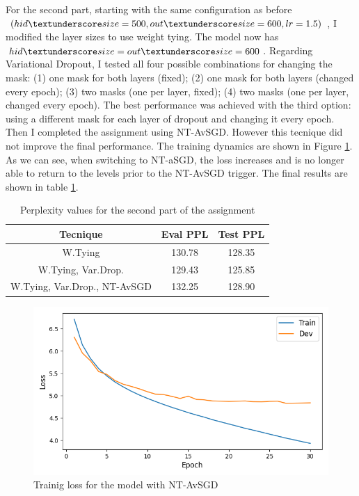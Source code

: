 \documentclass[a4paper]{article}
\begin{document}
For the second part, starting with the same configuration as before \((hid \textunderscore size=500, out \textunderscore size=600, lr=1.5)\), I modified the layer sizes to use weight tying.
The model now has \(hid \textunderscore size=out \textunderscore size=600\).
Regarding Variational Dropout, I tested all four possible combinations for changing the mask: (1) one mask for both layers (fixed); (2) one mask for both layers (changed every epoch); (3) two masks (one per layer, fixed); (4) two masks (one per layer, changed every epoch). The best performance was achieved with the third option: using a different mask for each layer of dropout and changing it every epoch.
Then I completed the assignment using NT-AvSGD. However this tecnique did not improve the final performance. The training dynamics are shown in Figure \ref{fig:fig2}. As we can see, when switching to NT-aSGD, the loss increases and is no longer able to return to the levels prior to the NT-AvSGD trigger.
The final results are shown in table \ref{tab:results2}.


\begin{table}[h]
  \centering
  \begin{tabular}{|c|c|c|}
    \hline
    \textbf{Tecnique} & \textbf{Eval PPL} & \textbf{Test PPL} \\
    \hline
    W.Tying & 130.78 & 128.35 \\
    W.Tying, Var.Drop. & 129.43 & 125.85 \\
    W.Tying, Var.Drop., NT-AvSGD & 132.25 & 128.90 \\
    \hline
  \end{tabular}
  \caption{Perplexity values for the second part of the assignment}
  \label{tab:results2}

\end{table}

\begin{figure}[h]
  \includegraphics[width=\linewidth]{./images/plot_2_loss.png}
  \caption{Trainig loss for the model with NT-AvSGD}
  \label{fig:fig2}
\end{figure}





\end{document}
